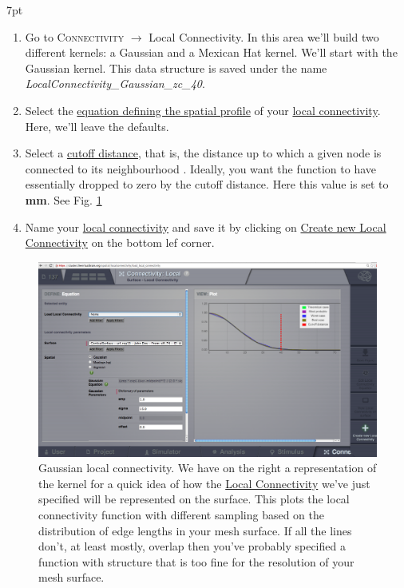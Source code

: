 \documentclass{tufte-handout}
\newenvironment{formal}{%
  \def\FrameCommand{%
    \hspace{1pt}%
    {\color{DarkBlue}\vrule width 2pt}%
    {\color{formalshade}\vrule width 4pt}%
    \colorbox{formalshade}%
  }%
  \MakeFramed{\advance\hsize-\width\FrameRestore}%
  \noindent\hspace{-4.55pt}%
  \begin{adjustwidth}{}{7pt}%
  \vspace{2pt}\vspace{2pt}%
}
{%
  \vspace{2pt}\end{adjustwidth}\endMakeFramed%
}
\begin{document}
\begin{formal}
\begin{enumerate}
\item Go to \textsc{Connectivity} $\rightarrow$ {Local Connectivity}. 
In this area we'll build two different kernels: a Gaussian and a Mexican Hat kernel. 
We'll start with the Gaussian kernel. This data structure is saved under the name \textit{LocalConnectivity\_Gaussian\_zc\_40}.
\item Select the \underline{equation defining the spatial profile} of your \underline{local connectivity}. Here, we'll leave the defaults.
\item Select a \underline{cutoff distance}, that is, the distance up to which a given node is connected to its neighbourhood \citep{Spiegler_2013}. Ideally, you want the function to have essentially dropped to zero by the cutoff distance. Here this value is set to \textbf{\unit[40]{mm}}. See Fig. \ref{fig:lc_gaussian}
\item Name your \underline{local connectivity} and save it by clicking on \underline{Create new Local Connectivity} on the bottom lef corner. 
\end{enumerate}
\end{formal}

\begin{figure}[h]
  \includegraphics[width=\linewidth]{Handout_UI_BuildingYourOwnBrainNetworkModel_YourOwnLocalConnectivity}%
  \caption{Gaussian local connectivity. We have on the right a representation of the kernel for a quick idea of how
the \underline{Local Connectivity} we've just specified will be represented on the
surface. This plots the local connectivity function with different sampling
based on the distribution of edge lengths in your mesh surface. If all the
lines don't, at least mostly, overlap then you've probably specified a
function with structure that is too fine for the resolution of your mesh
surface. }%
  \label{fig:lc_gaussian}%
\end{figure}
\end{document}
